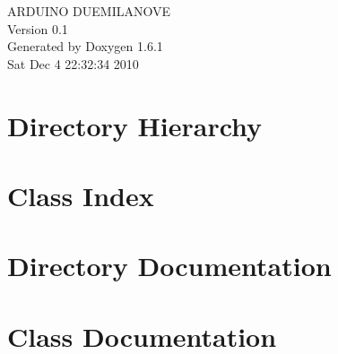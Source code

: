 \documentclass[a4paper]{book}
\begin{document}
\hypersetup{pageanchor=false}
\begin{titlepage}
\vspace*{7cm}
\begin{center}
{\Large ARDUINO DUEMILANOVE \\[1ex]\large Version 0.1 }\\
\vspace*{1cm}
{\large Generated by Doxygen 1.6.1}\\
\vspace*{0.5cm}
{\small Sat Dec 4 22:32:34 2010}\\
\end{center}
\end{titlepage}
\clearemptydoublepage
{}
\tableofcontents
\clearemptydoublepage
{}
\hypersetup{pageanchor=true}
\chapter{Directory Hierarchy}

\chapter{Class Index}

\chapter{Directory Documentation}




\chapter{Class Documentation}


\printindex
\end{document}
